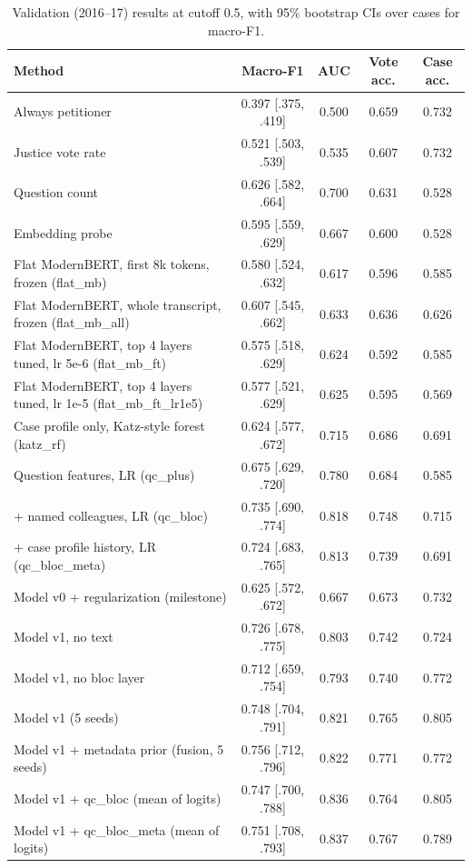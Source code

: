 \begin{table}[h]
  \centering
  \small
  \begin{tabular}{lcccc}
    \toprule
    Method & Macro-F1 & AUC & Vote acc. & Case acc. \\
    \midrule
    Always petitioner & 0.397 {\scriptsize[.375, .419]} & 0.500 & 0.659 & 0.732 \\
    Justice vote rate & 0.521 {\scriptsize[.503, .539]} & 0.535 & 0.607 & 0.732 \\
    Question count & 0.626 {\scriptsize[.582, .664]} & 0.700 & 0.631 & 0.528 \\
    Embedding probe & 0.595 {\scriptsize[.559, .629]} & 0.667 & 0.600 & 0.528 \\
    Flat ModernBERT, first 8k tokens, frozen (flat\_mb) & 0.580 {\scriptsize[.524, .632]} & 0.617 & 0.596 & 0.585 \\
    Flat ModernBERT, whole transcript, frozen (flat\_mb\_all) & 0.607 {\scriptsize[.545, .662]} & 0.633 & 0.636 & 0.626 \\
    Flat ModernBERT, top 4 layers tuned, lr 5e-6 (flat\_mb\_ft) & 0.575 {\scriptsize[.518, .629]} & 0.624 & 0.592 & 0.585 \\
    Flat ModernBERT, top 4 layers tuned, lr 1e-5 (flat\_mb\_ft\_lr1e5) & 0.577 {\scriptsize[.521, .629]} & 0.625 & 0.595 & 0.569 \\
    Case profile only, Katz-style forest (katz\_rf) & 0.624 {\scriptsize[.577, .672]} & 0.715 & 0.686 & 0.691 \\
    Question features, LR (qc\_plus) & 0.675 {\scriptsize[.629, .720]} & 0.780 & 0.684 & 0.585 \\
    + named colleagues, LR (qc\_bloc) & 0.735 {\scriptsize[.690, .774]} & 0.818 & 0.748 & 0.715 \\
    + case profile history, LR (qc\_bloc\_meta) & 0.724 {\scriptsize[.683, .765]} & 0.813 & 0.739 & 0.691 \\
    Model v0 + regularization (milestone) & 0.625 {\scriptsize[.572, .672]} & 0.667 & 0.673 & 0.732 \\
    Model v1, no text & 0.726 {\scriptsize[.678, .775]} & 0.803 & 0.742 & 0.724 \\
    Model v1, no bloc layer & 0.712 {\scriptsize[.659, .754]} & 0.793 & 0.740 & 0.772 \\
    Model v1 (5 seeds) & 0.748 {\scriptsize[.704, .791]} & 0.821 & 0.765 & 0.805 \\
    Model v1 + metadata prior (fusion, 5 seeds) & 0.756 {\scriptsize[.712, .796]} & 0.822 & 0.771 & 0.772 \\
    Model v1 + qc\_bloc (mean of logits) & 0.747 {\scriptsize[.700, .788]} & 0.836 & 0.764 & 0.805 \\
    Model v1 + qc\_bloc\_meta (mean of logits) & 0.751 {\scriptsize[.708, .793]} & 0.837 & 0.767 & 0.789 \\
    \bottomrule
  \end{tabular}
  \caption{Validation (2016--17) results at cutoff 0.5, with 95\% bootstrap CIs over cases for macro-F1.}
  \label{tab:main}
\end{table}